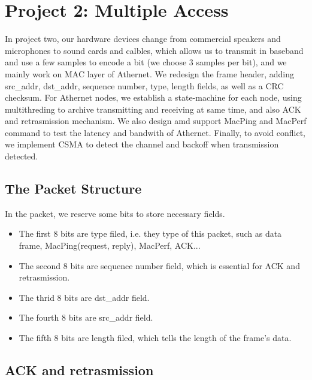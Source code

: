 \documentclass[11pt, conference]{IEEEtran}
\begin{document}
\section{Project 2: Multiple Access}

In project two, our hardware devices change from commercial speakers and microphones to sound cards and calbles, which allows us to transmit in baseband and use a few samples to 
encode a bit (we choose 3 samples per bit), and we mainly work on MAC layer of Athernet. We redesign the frame header, adding src\_addr, dst\_addr, sequence number, type, length fields,
as well as a CRC checksum. For Athernet nodes, we establish a state-machine for each node, using multithreding to archive transmitting and receiving at same time, and also ACK and retrasmission
mechanism. We also design amd support MacPing and MacPerf command to test the latency and bandwith of Athernet. Finally, to avoid conflict, we implement CSMA to detect the channel and backoff when transmission detected.

\subsection{The Packet Structure}

In the packet, we reserve some bits to store necessary fields.
\begin{itemize}
\item The first 8 bits are type filed, i.e. they type of this packet, such as data frame, MacPing(request, reply), MacPerf, ACK...
\item The second 8 bits are sequence number field, which is essential for ACK and retrasmission.
\item The thrid 8 bits are dst\_addr field. 
\item The fourth 8 bits are src\_addr field.
\item The fifth 8 bits are length filed, which tells the length of the frame's data.
\end{itemize}

\subsection{ACK and retrasmission}
\end{document}
